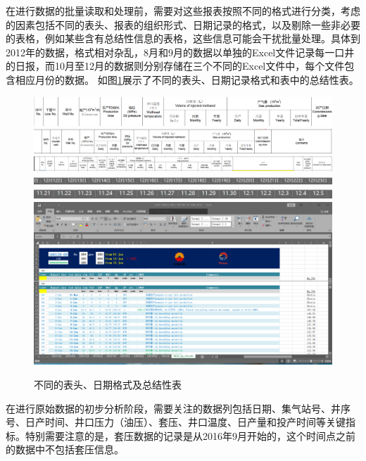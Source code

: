 在进行数据的批量读取和处理前，需要对这些报表按照不同的格式进行分类，考虑的因素包括不同的表头、报表的组织形式、日期记录的格式，以及剔除一些非必要的表格，例如某些含有总结性信息的表格，这些信息可能会干扰批量处理。具体到2012年的数据，格式相对杂乱，8月和9月的数据以单独的Excel文件记录每一口井的日报，而10月至12月的数据则分别存储在三个不同的Excel文件中，每个文件包含相应月份的数据。
如图\ref{fig:difTable}展示了不同的表头、日期记录格式和表中的总结性表。
\begin{figure}[H]
    \centering
    \includegraphics[scale=0.3,angle=0]{figure/表头1.png}
    \hfil
    \includegraphics[scale=0.3,angle=0]{figure/表头2.png}
    \hfil
    \includegraphics[scale=0.25,angle=0]{figure/表头3.png}
    \hfil
    \includegraphics[scale=0.3,angle=0]{figure/日期格式1.png}
    \hfil
    \includegraphics[scale=0.3,angle=0]{figure/日期格式2.png}
    \hfil
    \includegraphics[scale=0.3,angle=0]{figure/总结性表.png}
    \caption{不同的表头、日期格式及总结性表}
    \label{fig:difTable}
\end{figure}

在进行原始数据的初步分析阶段，需要关注的数据列包括日期、集气站号、井序号、日产时间、井口压力（油压）、套压、井口温度、日产量和投产时间等关键指标。特别需要注意的是，套压数据的记录是从2016年9月开始的，这个时间点之前的数据中不包括套压信息。

